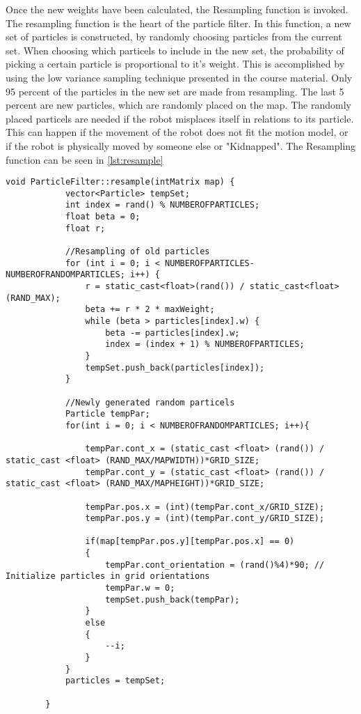 \documentclass[Main]{subfiles}
\begin{document}
	
	Once the new weights have been calculated, the Resampling function is invoked. 
	The resampling function is the heart of the particle filter.
	In this function, a new set of particles is constructed, by randomly choosing particles from the current set.
	When choosing which particels to include in the new set, the probability of picking a certain particle is proportional to it's weight.
	This is accomplished by using the low variance sampling technique presented in the course material.
	Only 95 percent of the particles in the new set are made from resampling.
	The last 5 percent are new particles, which are randomly placed on the map.
	The randomly placed particels are needed if the robot misplaces itself in relations to its particle.
	This can happen if the movement of the robot does not fit the motion model, or if the robot is physically moved by someone else or "Kidnapped". 
	The Resampling function can be seen in \autoref{lst:resample}
	
	\begin{lstlisting}[caption=Resampling function of ParticleFilter, style=Code-C++, label=lst:resample]
		void ParticleFilter::resample(intMatrix map) {
			vector<Particle> tempSet;
			int index = rand() % NUMBEROFPARTICLES;
			float beta = 0;
			float r;
		
			//Resampling of old particles
			for (int i = 0; i < NUMBEROFPARTICLES-NUMBEROFRANDOMPARTICLES; i++) {
				r = static_cast<float>(rand()) / static_cast<float>(RAND_MAX);
				beta += r * 2 * maxWeight;
				while (beta > particles[index].w) {
					beta -= particles[index].w;
					index = (index + 1) % NUMBEROFPARTICLES;
				}
				tempSet.push_back(particles[index]);
			}
		
			//Newly generated random particels
			Particle tempPar;
			for(int i = 0; i < NUMBEROFRANDOMPARTICLES; i++){
		
				tempPar.cont_x = (static_cast <float> (rand()) / static_cast <float> (RAND_MAX/MAPWIDTH))*GRID_SIZE;
				tempPar.cont_y = (static_cast <float> (rand()) / static_cast <float> (RAND_MAX/MAPHEIGHT))*GRID_SIZE;
	
				tempPar.pos.x = (int)(tempPar.cont_x/GRID_SIZE);
				tempPar.pos.y = (int)(tempPar.cont_y/GRID_SIZE);
		
				if(map[tempPar.pos.y][tempPar.pos.x] == 0)
				{
					tempPar.cont_orientation = (rand()%4)*90; // Initialize particles in grid orientations
					tempPar.w = 0;
					tempSet.push_back(tempPar);
				}
				else
				{
					--i;
				}
			}
			particles = tempSet;
	
		}	
	\end{lstlisting}
\end{document}
